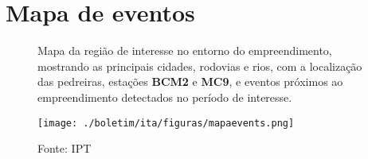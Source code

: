 
    \newpage
    \section{Mapa de eventos}
    \begin{figure}[ht!]
    \centering
    \captionsetup{justification=justified, singlelinecheck=false, width=1\textwidth}
    \caption{Mapa da região de interesse no entorno do empreendimento, mostrando as principais cidades, rodovias e rios, com a localização das pedreiras, estações \textbf{BCM2} e \textbf{MC9}, e eventos próximos ao empreendimento detectados no período de interesse.}
    \begin{mdframed}[
        linecolor=black,
        linewidth=1pt,
        roundcorner=10pt,
    ]
    \begin{center}
    \texttt{[image: ./boletim/ita/figuras/mapaevents.png]}
    \end{center}
    \end{mdframed}
    \caption*{Fonte: IPT}
    \end{figure}
    \newpage
    